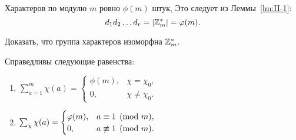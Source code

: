 \begin{remark}
    Характеров по модулю $m$ ровно $\phi(m)$ штук, Это следует из Леммы~\ref{lm:II-1}: 
    \[
        d_1 d_2 \dots d_r = \left| \mathbb{Z}_{m}^{\ast} \right| = \varphi(m).
    \]
\end{remark}

\begin{nproblem}
\label{prb:II-1}
    Доказать, что группа характеров изоморфна $\mathbb{Z}_{m}^{\ast}$.
\end{nproblem}

\begin{nlemma}
\label{lm:II-3}
    Справедливы следующие равенства:
    \begin{enumerate}
        \item
            $\sum_{a=1}^m \chi(a) =
                \begin{cases}
                    \phi(m), & \chi = \chi_0, \\
                    0, & \chi \ne \chi_0.
                \end{cases}$
        \item
            $\sum_\chi \chi(a) =
                \begin{cases}
                    \varphi(m), & a \equiv 1 \pmod m, \\
                    0, & a \not\equiv 1 \pmod{m}.
                \end{cases}$
    \end{enumerate}
\end{nlemma}
